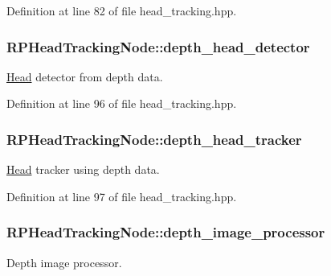 \-Definition at line 82 of file head\-\_\-tracking.\-hpp.

\hypertarget{class_r_p_head_tracking_node_af8c98fb4b2589bd038006d9f5d682f58}{
\subsubsection[{depth\-\_\-head\-\_\-detector}]{ {\bf \-R\-P\-Head\-Tracking\-Node\-::depth\-\_\-head\-\_\-detector}}}\label{class_r_p_head_tracking_node_af8c98fb4b2589bd038006d9f5d682f58}
\hyperlink{struct_head}{\-Head} detector from depth data. 

\-Definition at line 96 of file head\-\_\-tracking.\-hpp.

\hypertarget{class_r_p_head_tracking_node_aeb67f2aec1bc4819304ebea3da893c36}{
\subsubsection[{depth\-\_\-head\-\_\-tracker}]{ {\bf \-R\-P\-Head\-Tracking\-Node\-::depth\-\_\-head\-\_\-tracker}}}\label{class_r_p_head_tracking_node_aeb67f2aec1bc4819304ebea3da893c36}
\hyperlink{struct_head}{\-Head} tracker using depth data. 

\-Definition at line 97 of file head\-\_\-tracking.\-hpp.

\hypertarget{class_r_p_head_tracking_node_adf69f6a784f12825b110d0a852954ef9}{
\subsubsection[{depth\-\_\-image\-\_\-processor}]{ {\bf \-R\-P\-Head\-Tracking\-Node\-::depth\-\_\-image\-\_\-processor}}}\label{class_r_p_head_tracking_node_adf69f6a784f12825b110d0a852954ef9}
\-Depth image processor. 

